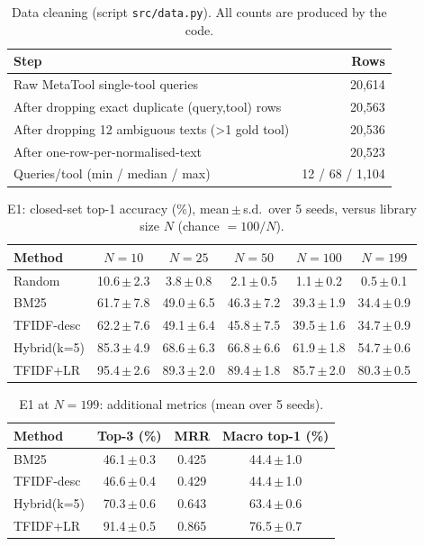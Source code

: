 \begin{table}[t]\centering\caption{Data cleaning (script \texttt{src/data.py}). All counts are produced by the code.}\label{tab:data}\small\begin{tabular}{lr}\toprule Step & Rows\\\midrule
Raw MetaTool single-tool queries & 20,614\\
After dropping exact duplicate (query,tool) rows & 20,563\\
After dropping 12 ambiguous texts (>1 gold tool) & 20,536\\
After one-row-per-normalised-text & 20,523\\
Queries/tool (min / median / max) & 12 / 68 / 1,104\\\bottomrule\end{tabular}\end{table}

\begin{table}[t]\centering\caption{E1: closed-set top-1 accuracy (\%), mean\,$\pm$\,s.d.\ over 5 seeds, versus library size $N$ (chance $=100/N$).}\label{tab:e1}\small\begin{tabular}{lccccc}\toprule Method & $N{=}10$ & $N{=}25$ & $N{=}50$ & $N{=}100$ & $N{=}199$\\\midrule
Random & 10.6\,$\pm$\,2.3 & 3.8\,$\pm$\,0.8 & 2.1\,$\pm$\,0.5 & 1.1\,$\pm$\,0.2 & 0.5\,$\pm$\,0.1\\
BM25 & 61.7\,$\pm$\,7.8 & 49.0\,$\pm$\,6.5 & 46.3\,$\pm$\,7.2 & 39.3\,$\pm$\,1.9 & 34.4\,$\pm$\,0.9\\
TFIDF-desc & 62.2\,$\pm$\,7.6 & 49.1\,$\pm$\,6.4 & 45.8\,$\pm$\,7.5 & 39.5\,$\pm$\,1.6 & 34.7\,$\pm$\,0.9\\
Hybrid(k=5) & 85.3\,$\pm$\,4.9 & 68.6\,$\pm$\,6.3 & 66.8\,$\pm$\,6.6 & 61.9\,$\pm$\,1.8 & 54.7\,$\pm$\,0.6\\
TFIDF+LR & 95.4\,$\pm$\,2.6 & 89.3\,$\pm$\,2.0 & 89.4\,$\pm$\,1.8 & 85.7\,$\pm$\,2.0 & 80.3\,$\pm$\,0.5\\
\bottomrule\end{tabular}\end{table}

\begin{table}[t]\centering\caption{E1 at $N{=}199$: additional metrics (mean over 5 seeds).}\label{tab:e1b}\small\begin{tabular}{lccc}\toprule Method & Top-3 (\%) & MRR & Macro top-1 (\%)\\\midrule
BM25 & 46.1\,$\pm$\,0.3 & 0.425 & 44.4\,$\pm$\,1.0\\
TFIDF-desc & 46.6\,$\pm$\,0.4 & 0.429 & 44.4\,$\pm$\,1.0\\
Hybrid(k=5) & 70.3\,$\pm$\,0.6 & 0.643 & 63.4\,$\pm$\,0.6\\
TFIDF+LR & 91.4\,$\pm$\,0.5 & 0.865 & 76.5\,$\pm$\,0.7\\
\bottomrule\end{tabular}\end{table}

